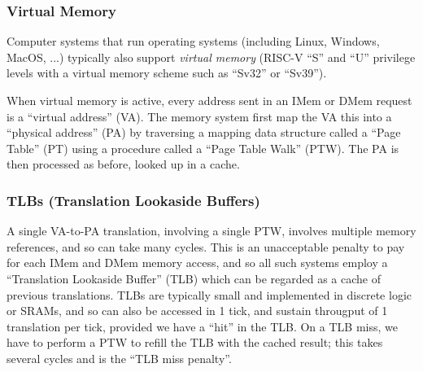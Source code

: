 
\subsubsection{Virtual Memory}


Computer systems that run operating systems (including Linux, Windows,
MacOS, ...) typically also support \emph{virtual memory} (RISC-V ``S''
and ``U'' privilege levels with a virtual memory scheme such as
``Sv32'' or ``Sv39'').




When virtual memory is active, every address sent in an IMem or DMem
request is a ``virtual address'' (VA).  The memory system first map
the VA this into a ``physical address'' (PA) by traversing a mapping
data structure called a ``Page Table'' (PT) using a procedure called a
``Page Table Walk'' (PTW).  The PA is then processed as before, {\ie}
looked up in a cache.


\subsubsection{TLBs (Translation Lookaside Buffers)}


A single VA-to-PA translation, involving a single PTW, involves
multiple memory references, and so can take many cycles.  This is an
unacceptable penalty to pay for each IMem and DMem memory access, and
so all such systems employ a ``Translation Lookaside Buffer'' (TLB)
which can be regarded as a cache of previous translations.  TLBs are
typically small and implemented in discrete logic or SRAMs, and so can
also be accessed in 1 tick, and sustain througput of 1 translation per
tick, provided we have a ``hit'' in the TLB.  On a TLB miss, we have
to perform a PTW to refill the TLB with the cached result; this takes
several cycles and is the ``TLB miss penalty''.

